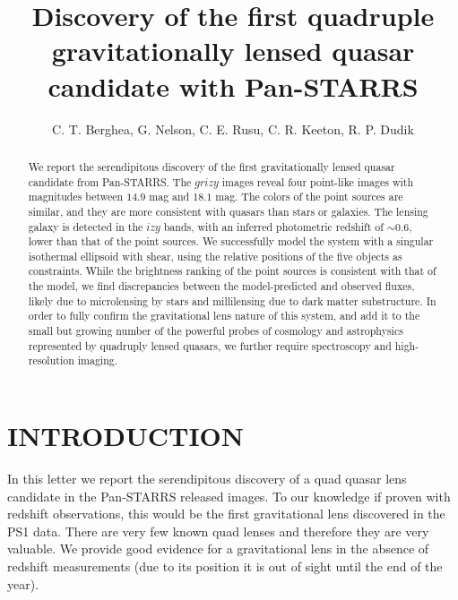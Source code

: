 \documentclass[manuscript]{aastex}
\begin{document}
\title{ Discovery of the first quadruple gravitationally lensed quasar candidate with Pan-STARRS }

\author{C. T. Berghea, G. Nelson, C. E. Rusu, C. R. Keeton, R. P. Dudik}



\begin{abstract}

We report the serendipitous discovery of the first gravitationally lensed quasar candidate from Pan-STARRS. The $grizy$ images reveal four point-like images with magnitudes between $14.9$ mag and $18.1$ mag. The colors of the point sources are similar, and they are more consistent with quasars than stars or galaxies. The lensing galaxy is detected in the $izy$ bands, with an inferred photometric redshift of $\sim 0.6$, lower than that of the point sources. We successfully model the system with a singular isothermal ellipsoid with shear, using the relative positions of the five objects as constraints. While the brightness ranking of the point sources is consistent with that of the model, we find discrepancies between the model-predicted and observed fluxes, likely due to microlensing by stars and millilensing due to dark matter substructure. In order to fully confirm the gravitational lens nature of this system, and add it to the small but growing number of the powerful probes of cosmology and astrophysics represented by quadruply lensed quasars, we further require spectroscopy and high-resolution imaging.

\end{abstract}


\section{INTRODUCTION}

In this letter we report the serendipitous discovery of a quad quasar lens candidate in the Pan-STARRS released images. To our knowledge if proven with redshift observations, this would be the first gravitational lens discovered in the PS1 data. There are very few known quad lenses and therefore they are very valuable. We provide good evidence for a gravitational lens in the absence of redshift measurements (due to its position it is out of sight until the end of the year).
\end{document}
